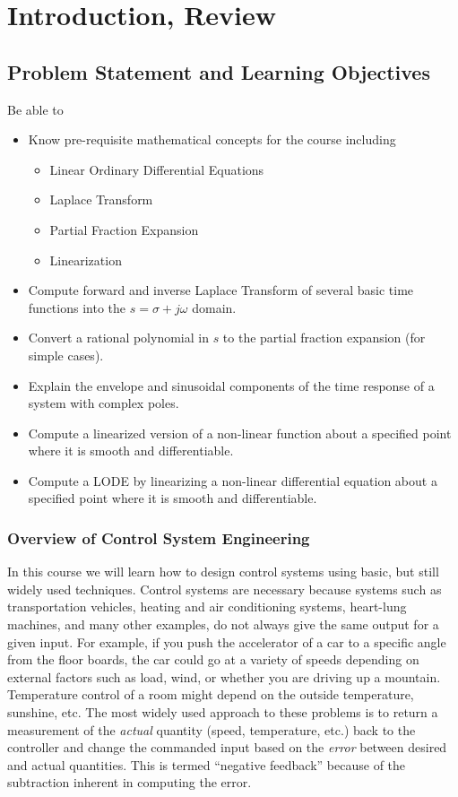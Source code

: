 %
%
%

\chapter{Introduction, Review}

\section{Problem Statement and Learning Objectives}

Be able to
\begin{itemize}
    \item Know pre-requisite mathematical concepts for the course including
    \begin{itemize}
        \item Linear Ordinary Differential Equations
        \item Laplace Transform
        \item Partial Fraction Expansion
        \item Linearization
    \end{itemize}
    \item Compute forward and inverse Laplace Transform of several basic time functions into the $s=\sigma+j\omega$ domain.
    \item Convert a rational polynomial in $s$ to the partial fraction expansion (for simple cases).
    \item Explain the envelope and sinusoidal components of the time response of a system with complex poles.
    \item Compute a linearized version of a non-linear function about a specified point where it is smooth and differentiable.
    \item Compute a LODE by linearizing a non-linear differential equation about a specified point where it is smooth and differentiable.
\end{itemize}


\subsection{Overview of Control System Engineering}


In this course we will learn how to design control systems using basic, but still widely used techniques.
Control systems are necessary because systems such as transportation vehicles, heating and air conditioning systems,
heart-lung machines, and many other examples, do not always give the same output for a given input.  For example,
if you push the accelerator of a car to a specific angle from the floor boards, the car could go at a variety of speeds
depending on external factors such as load, wind, or whether you are driving up a mountain.   Temperature control of a room
might depend on the outside temperature, sunshine, etc.   The most widely used approach to these problems is to
return a measurement of the {\it actual } quantity (speed, temperature, etc.) back to the controller and change the
commanded input based on the {\it error} between desired and actual quantities.    This is termed ``negative feedback''
because of the subtraction inherent in computing the error.

